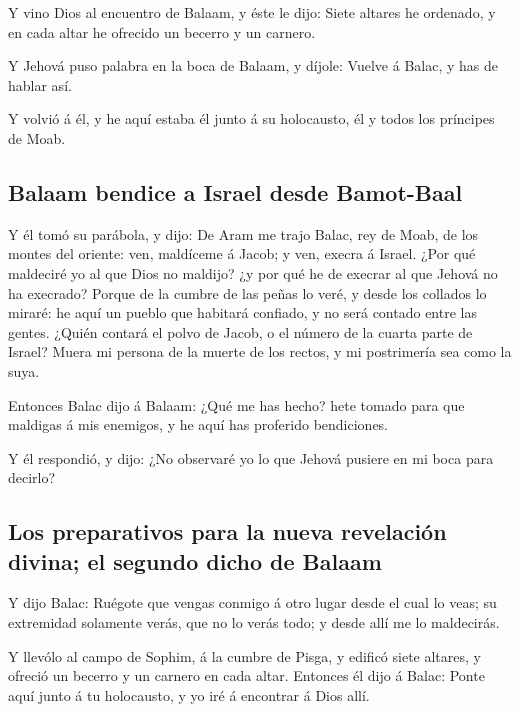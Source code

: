  Y vino Dios al encuentro de Balaam, y éste le dijo: Siete
altares he ordenado, y en cada altar he ofrecido un becerro y un
carnero.

 Y Jehová puso palabra en la boca de Balaam, y díjole:
Vuelve á Balac, y has de hablar así.

 Y volvió á él, y he aquí estaba él junto á su holocausto,
él y todos los príncipes de Moab.

\hypertarget{balaam-bendice-a-israel-desde-bamot-baal}{%
\subsection{Balaam bendice a Israel desde
Bamot-Baal}\label{balaam-bendice-a-israel-desde-bamot-baal}}

 Y él tomó su parábola, y dijo: De Aram me trajo Balac, rey
de Moab, de los montes del oriente: ven, maldíceme á Jacob; y ven,
execra á Israel.  ¿Por qué maldeciré yo al que Dios no
maldijo? ¿y por qué he de execrar al que Jehová no ha execrado?
 Porque de la cumbre de las peñas lo veré, y desde los
collados lo miraré: he aquí un pueblo que habitará confiado, y no será
contado entre las gentes.  ¿Quién contará el polvo de
Jacob, o el número de la cuarta parte de Israel? Muera mi persona de la
muerte de los rectos, y mi postrimería sea como la suya.

 Entonces Balac dijo á Balaam: ¿Qué me has hecho? hete
tomado para que maldigas á mis enemigos, y he aquí has proferido
bendiciones.

 Y él respondió, y dijo: ¿No observaré yo lo que Jehová
pusiere en mi boca para decirlo?

\hypertarget{los-preparativos-para-la-nueva-revelaciuxf3n-divina-el-segundo-dicho-de-balaam}{%
\subsection{Los preparativos para la nueva revelación divina; el segundo
dicho de
Balaam}\label{los-preparativos-para-la-nueva-revelaciuxf3n-divina-el-segundo-dicho-de-balaam}}

 Y dijo Balac: Ruégote que vengas conmigo á otro lugar
desde el cual lo veas; su extremidad solamente verás, que no lo verás
todo; y desde allí me lo maldecirás.

 Y llevólo al campo de Sophim, á la cumbre de Pisga, y
edificó siete altares, y ofreció un becerro y un carnero en cada altar.
 Entonces él dijo á Balac: Ponte aquí junto á tu
holocausto, y yo iré á encontrar á Dios allí.

